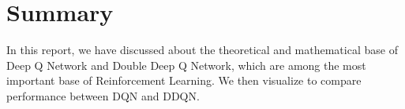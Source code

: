 \documentclass{article}
\begin{document}
\section{Summary}
In this report, we have discussed about the theoretical and mathematical base of Deep Q Network and Double Deep Q Network, which are among the most important base of Reinforcement Learning. We then visualize to compare performance between DQN and DDQN.
\newpage
\medskip

\end{document}
